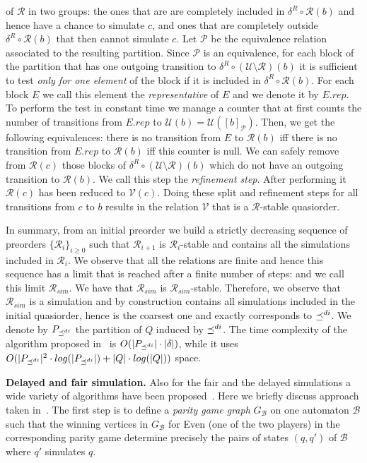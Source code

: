 of $\mathscr{R}$ in two groups: the ones that are are completely included
in $\delta^R \circ \mathscr{R}(b)$ and hence have a chance to simulate $c$, and
ones that are completely outside $\delta^R \circ \mathscr{R}(b)$ that then
cannot simulate $c$.
Let $\mathscr{P}$ be the equivalence relation associated to the resulting partition.
Since $\mathscr{P}$ is an equivalence, for each block of the partition that has one outgoing
transition to $\delta^R \circ (\mathscr{U} \setminus \mathscr{R})(b)$ it is
sufficient to test \emph{only for one element} of the block if it is
included in $\delta^R \circ \mathscr{R}(b)$.
For each block $E$ we call this element the \emph{representative} of $E$ and
we denote it by $E.rep$.
To perform the test in constant time we manage a counter that at first counts
the number of transitions from $E.rep$ to $\mathscr{U}(b) = \mathscr{U}([b]_{\mathscr{P}})$.
Then, we get the following equivalences:
there is no transition from $E$ to $\mathscr{R}(b)$ iff there is no transition
from $E.rep$ to $\mathscr{R}(b)$ iff this counter is null.
We can safely remove from $\mathscr{R}(c)$ those blocks of
$\delta^R \circ (\mathscr{U} \setminus \mathscr{R})(b)$ which do not have an
outgoing transition to $\mathscr{R}(b)$.
We call this step the \emph{refinement step}.
After performing it $\mathscr{R}(c)$ has been reduced to $\mathscr{V}(c)$.
Doing these split and refinement steps for all transitions from $c$ to $b$
results in the relation $\mathscr{V}$ that is a $\mathscr{R}$-stable quasiorder.

In summary, from an initial preorder we build a strictly decreasing
sequence of preorders $\{\mathscr{R}_i\}_{i \geq 0}$ such that $\mathscr{R}_{i+1}$
is $\mathscr{R}_i$-stable and contains all the simulations included in $\mathscr{R}_i$.
We observe that all the relations are finite and hence this sequence has a limit
that is reached after a finite number of steps: and we call this limit $\mathscr{R}_{sim}$.
We have that $\mathscr{R}_{sim}$ is $\mathscr{R}_{sim}$-stable.
Therefore, we observe that $\mathscr{R}_{sim}$ is a simulation and by construction
contains all simulations included in the initial quasiorder, hence is the
coarsest one and exactly corresponds to $\preceq^{di}$.
We denote by $P_{\preceq^{di}}$ the partition of $Q$ induced by $\preceq^{di}$.
The time complexity of the algorithm proposed in~\cite{cece2017foundation}
is $O(|P_{\preceq^{di}}| \cdot |\delta|)$, while it uses $O(|P_{\preceq^{di}}|^2 \cdot log(|P_{\preceq^{di}}|) + |Q| \cdot log(|Q|))$
space.

\textbf{Delayed and fair simulation.}
Also for the fair and the delayed simulations a wide variety of algorithms have
been proposed~\cite{clemente2017efficient,henzinger2002fair}.
Here we briefly discuss approach taken in~\cite{etessami2005fair}.
The first step is to define a \emph{parity game graph} $G_{\mathcal{B}}$ on
one \Buchi{} automaton $\mathcal{B}$ such that the winning vertices in $G_{\mathcal{B}}$
for Even (one of the two players) in the corresponding parity game determine precisely the
pairs of states $(q,q')$ of $\mathcal{B}$ where $q'$ simulates $q$.

